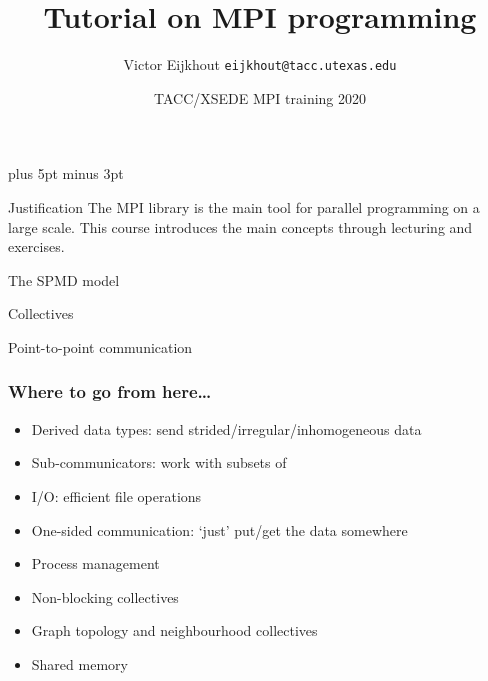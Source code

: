 \documentclass[11pt,headernav]{beamer}
\newcounter{tacc}
\def\Location{}%
\def\courseyear{2020}
\def\Location{TACC HPC Training \courseyear}
\def\Location{TACC/XSEDE MPI training \courseyear}
\def\TitleExtra{}
\begin{document}
\parskip=10pt plus 5pt minus 3pt

\title{Tutorial on MPI programming\TitleExtra}
\author{Victor Eijkhout {\tt eijkhout@tacc.utexas.edu}}
\date{\Location}

\begin{frame}
  \titlepage
\end{frame}

\begin{xsede}
  
\end{xsede}

\begin{frame}{Justification}
  The MPI library is the main tool
  for parallel programming on a large scale.
  This course introduces the main concepts
  through lecturing and exercises.
\end{frame}


 {The SPMD model}


 {Collectives}


 {Point-to-point communication}


\iffalse
\begin{exerciseframe}[serialsend]
  
\end{exerciseframe}
\fi

\begin{frame}[containsverbatim]\frametitle{Where to go from here\ldots}
  \begin{itemize}
  \item Derived data types: send strided/irregular/inhomogeneous data
  \item Sub-communicators: work with subsets of 
  \item I/O: efficient file operations
  \item One-sided communication: `just' put/get the data somewhere
  \item Process management
  \item Non-blocking collectives
  \item Graph topology and neighbourhood collectives
  \item Shared memory
  \end{itemize}
\end{frame}

\end{document}
